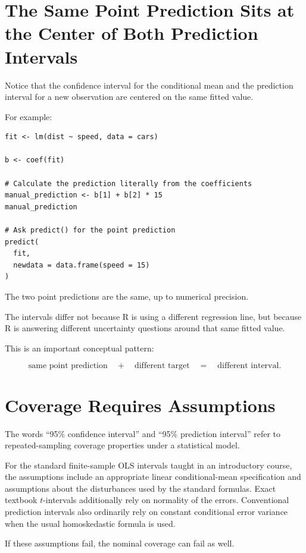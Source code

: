 \documentclass[11pt]{report}
\begin{document}
\section{The Same Point Prediction Sits at the Center of Both Prediction Intervals}

Notice that the confidence interval for the conditional mean and the prediction interval for a new observation are centered on the same fitted value.

For example:

\begin{lstlisting}
fit <- lm(dist ~ speed, data = cars)

b <- coef(fit)

# Calculate the prediction literally from the coefficients
manual_prediction <- b[1] + b[2] * 15
manual_prediction

# Ask predict() for the point prediction
predict(
  fit,
  newdata = data.frame(speed = 15)
)
\end{lstlisting}

The two point predictions are the same, up to numerical precision.

The intervals differ not because R is using a different regression line, but because R is answering different uncertainty questions around that same fitted value.

This is an important conceptual pattern:

\[
\text{same point prediction}
\quad+\quad
\text{different target}
\quad=\quad
\text{different interval}.
\]

\section{Coverage Requires Assumptions}

The words ``95\% confidence interval'' and ``95\% prediction interval'' refer to repeated-sampling coverage properties under a statistical model.

For the standard finite-sample OLS intervals taught in an introductory course, the assumptions include an appropriate linear conditional-mean specification and assumptions about the disturbances used by the standard formulas. Exact textbook \(t\)-intervals additionally rely on normality of the errors. Conventional prediction intervals also ordinarily rely on constant conditional error variance when the usual homoskedastic formula is used.

If these assumptions fail, the nominal coverage can fail as well.
\end{document}
